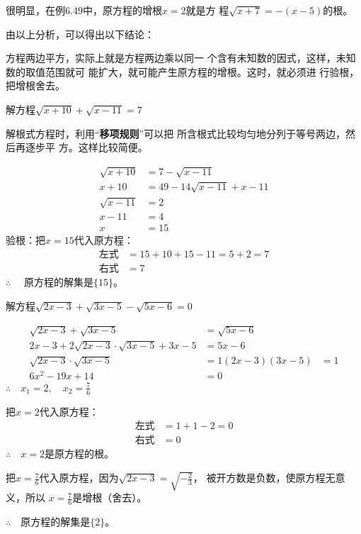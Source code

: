 很明显，在例6.49中，原方程的增根$x=2$就是方
程$\sqrt{x+7}=-(x-5)$的根。

由以上分析，可以得出以下结论：

\begin{blk}{}
    方程两边平方，实际上就是方程两边乘以同一
个含有未知数的因式，这样，未知数的取值范围就可
能扩大，就可能产生原方程的增根。这时，就必须进
行验根，把增根舍去。
\end{blk}



\begin{example}
    解方程$\sqrt{x+10}+\sqrt{x-11}=7$
\end{example}

\begin{analyze}
    解根式方程时，利用“\textbf{移项规则}”可以把
所含根式比较均匀地分列于等号两边，然后再逐步平
方。这样比较简便。
\end{analyze}


\begin{solution}
\begin{align*}
    \sqrt{x+10}&=7-\sqrt{x-11}\tag{移项}\\
x+10&=49-14\sqrt{x-11}+x-11  \tag{两边平方}\\
\sqrt{x-11}&=2\\
x-11&=4 \tag{两边平方}\\
x&=15
\end{align*}
验根：把$x=15$代入原方程：
\[\begin{split}
    \text{左式}&=15+10+15-11=5+2=7\\
    \text{右式}&=7
\end{split}\]
$\therefore\quad $
原方程的解集是$\{15\}$。
\end{solution}

\begin{example}
    解方程$\sqrt{2x-3}+\sqrt{3x-5}-\sqrt{5x-6}=0$
\end{example}

\begin{solution}
\begin{align*}
    \sqrt{2x-3}+\sqrt{3x-5}&=\sqrt{5x-6}  \tag{移项}\\
2x-3+2\sqrt{2x-3}\cdot \sqrt{3x-5}+3x-5&=5x-6  \tag{两边平方}\\
\sqrt{2x-3}\cdot \sqrt{3x-5}&=1
(2x-3)(3x-5)&=1   \tag{两边平方}\\
6x^2-19x+14&=0
\end{align*}
$\therefore\quad x_1=2,\quad x_2=\frac{7}{6}$

把$x=2$代入原方程：
\[\begin{split}
    \text{左式}&=1+1-2=0\\
    \text{右式}&=0
\end{split}\]
$\therefore\quad x=2$是原方程的根。

把$x=\frac{7}{6}$代入原方程，因为$\sqrt{2x-3}=\sqrt{-\frac{2}{3}}$，
被开方数是负数，使原方程无意义，所以
$x=\frac{7}{6}$是增根（舍去）。

$\therefore\quad $原方程的解集是$\{2\}$。
\end{solution}

